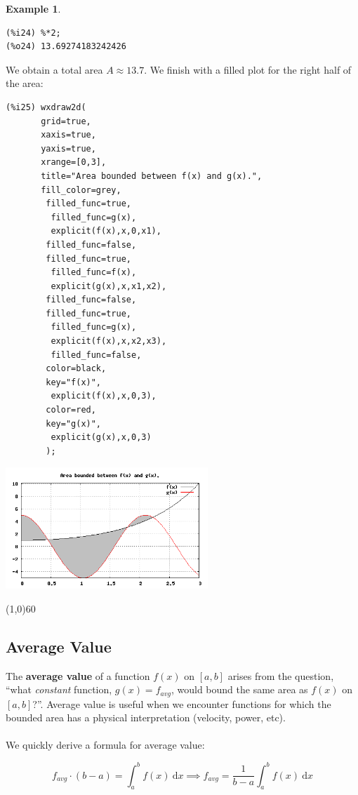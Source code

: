 \documentclass[10.5pt,twoside]{report}
\theoremstyle{definition}
\newtheorem{exmp}{Example}[section]
\begin{document}
\begin{exmp}
\begin{verbatim}
(%i24) %*2;
(%o24) 13.69274183242426
\end{verbatim}

We obtain a total area $A\approx 13.7$.  We finish with a filled plot for the right half of the area:


\begin{verbatim}
(%i25) wxdraw2d(
       grid=true,
       xaxis=true,
       yaxis=true,
       xrange=[0,3],
       title="Area bounded between f(x) and g(x).",
       fill_color=grey,
        filled_func=true,
         filled_func=g(x),
         explicit(f(x),x,0,x1),
        filled_func=false,
        filled_func=true,
         filled_func=f(x),
         explicit(g(x),x,x1,x2),
        filled_func=false,
        filled_func=true,
         filled_func=g(x),
         explicit(f(x),x,x2,x3),
         filled_func=false,
        color=black,
        key="f(x)",
         explicit(f(x),x,0,3),
        color=red,
        key="g(x)",
         explicit(g(x),x,0,3)
        );
\end{verbatim}

\includegraphics[width=3in]{example_7_3_1_3_2}

\end{exmp}

\line(1,0){60}
\linethickness{0.5mm}



\subsection{Average Value}

The \textbf{average value} of a function $f(x)$ on $[a,b]$ arises from the question, ``what \textit{constant} function, $g(x)=f_{avg}$, would bound the same area as $f(x)$ on $[a,b]$?''.  Average value is useful when we encounter functions for which the bounded area has a physical interpretation (velocity, power, etc).\\
${}$\\
We quickly derive a formula for average value:

$$f_{avg}\cdot (b-a)=\int_{a}^{b} f(x) \ \mathrm{d}x \implies f_{avg}=\frac{1}{b-a}\int_{a}^{b} f(x) \ \mathrm{d}x$$
\end{document}
